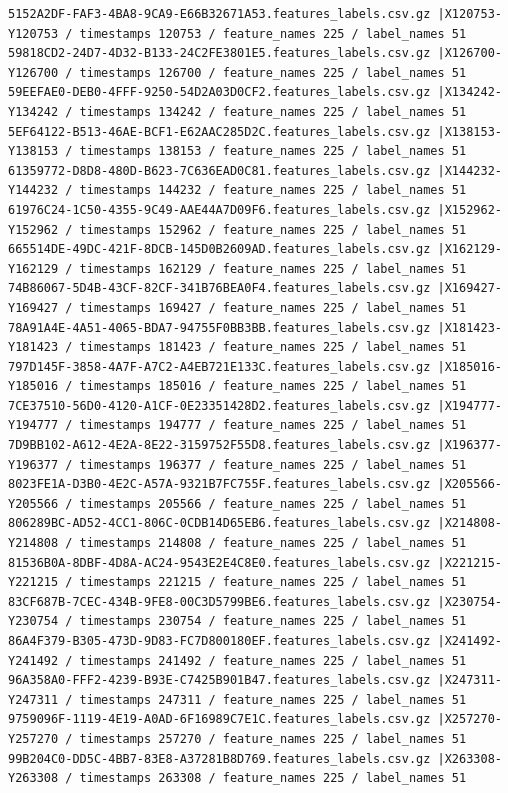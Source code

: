 \documentclass{UoNMCHA}
\numberwithin{equation}{section}
\begin{document}
\begin{lstlisting}[breaklines=true]
5152A2DF-FAF3-4BA8-9CA9-E66B32671A53.features_labels.csv.gz |X120753-Y120753 / timestamps 120753 / feature_names 225 / label_names 51
59818CD2-24D7-4D32-B133-24C2FE3801E5.features_labels.csv.gz |X126700-Y126700 / timestamps 126700 / feature_names 225 / label_names 51
59EEFAE0-DEB0-4FFF-9250-54D2A03D0CF2.features_labels.csv.gz |X134242-Y134242 / timestamps 134242 / feature_names 225 / label_names 51
5EF64122-B513-46AE-BCF1-E62AAC285D2C.features_labels.csv.gz |X138153-Y138153 / timestamps 138153 / feature_names 225 / label_names 51
61359772-D8D8-480D-B623-7C636EAD0C81.features_labels.csv.gz |X144232-Y144232 / timestamps 144232 / feature_names 225 / label_names 51
61976C24-1C50-4355-9C49-AAE44A7D09F6.features_labels.csv.gz |X152962-Y152962 / timestamps 152962 / feature_names 225 / label_names 51
665514DE-49DC-421F-8DCB-145D0B2609AD.features_labels.csv.gz |X162129-Y162129 / timestamps 162129 / feature_names 225 / label_names 51
74B86067-5D4B-43CF-82CF-341B76BEA0F4.features_labels.csv.gz |X169427-Y169427 / timestamps 169427 / feature_names 225 / label_names 51
78A91A4E-4A51-4065-BDA7-94755F0BB3BB.features_labels.csv.gz |X181423-Y181423 / timestamps 181423 / feature_names 225 / label_names 51
797D145F-3858-4A7F-A7C2-A4EB721E133C.features_labels.csv.gz |X185016-Y185016 / timestamps 185016 / feature_names 225 / label_names 51
7CE37510-56D0-4120-A1CF-0E23351428D2.features_labels.csv.gz |X194777-Y194777 / timestamps 194777 / feature_names 225 / label_names 51
7D9BB102-A612-4E2A-8E22-3159752F55D8.features_labels.csv.gz |X196377-Y196377 / timestamps 196377 / feature_names 225 / label_names 51
8023FE1A-D3B0-4E2C-A57A-9321B7FC755F.features_labels.csv.gz |X205566-Y205566 / timestamps 205566 / feature_names 225 / label_names 51
806289BC-AD52-4CC1-806C-0CDB14D65EB6.features_labels.csv.gz |X214808-Y214808 / timestamps 214808 / feature_names 225 / label_names 51
81536B0A-8DBF-4D8A-AC24-9543E2E4C8E0.features_labels.csv.gz |X221215-Y221215 / timestamps 221215 / feature_names 225 / label_names 51
83CF687B-7CEC-434B-9FE8-00C3D5799BE6.features_labels.csv.gz |X230754-Y230754 / timestamps 230754 / feature_names 225 / label_names 51
86A4F379-B305-473D-9D83-FC7D800180EF.features_labels.csv.gz |X241492-Y241492 / timestamps 241492 / feature_names 225 / label_names 51
96A358A0-FFF2-4239-B93E-C7425B901B47.features_labels.csv.gz |X247311-Y247311 / timestamps 247311 / feature_names 225 / label_names 51
9759096F-1119-4E19-A0AD-6F16989C7E1C.features_labels.csv.gz |X257270-Y257270 / timestamps 257270 / feature_names 225 / label_names 51
99B204C0-DD5C-4BB7-83E8-A37281B8D769.features_labels.csv.gz |X263308-Y263308 / timestamps 263308 / feature_names 225 / label_names 51

\end{lstlisting}
\end{document}
